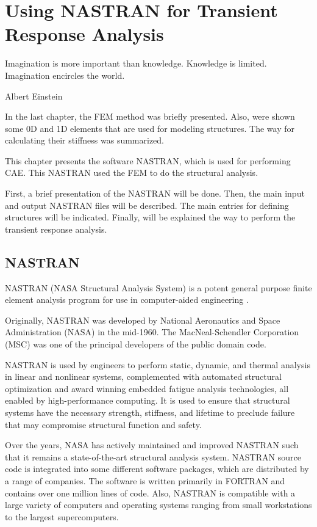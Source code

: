 \chapter{Using NASTRAN for Transient Response Analysis}
\label{chp:5}
\epigraph{Imagination is more important than knowledge. Knowledge is limited. Imagination encircles the world.}{Albert Einstein}

In the last chapter, the FEM method was briefly presented. Also, were shown some 0D and 1D elements that are used for modeling structures. The way for calculating their stiffness was summarized.

This chapter presents the software NASTRAN, which is used for performing CAE. This NASTRAN used the FEM to do the structural analysis.

First, a brief presentation of the NASTRAN will be done. Then, the main input and output NASTRAN files will be described. The main entries for defining structures will be indicated. Finally, will be explained the way to perform the transient response analysis.

\lstset{language=NASTRAN}
\lstset{basicstyle=\scriptsize\ttfamily,breaklines=true}

\section{NASTRAN}

NASTRAN (NASA Structural Analysis System) is a potent general purpose finite element analysis program for use in computer-aided engineering \cite{Nastran2001, Nastran2014}.

Originally, NASTRAN was developed by National Aeronautics and Space Administration (NASA) in the mid-1960. The MacNeal-Schendler Corporation (MSC) was one of the principal developers of the public domain code.

NASTRAN is used by engineers to perform static, dynamic, and thermal analysis in linear and nonlinear systems, complemented with automated structural optimization and award winning embedded fatigue analysis technologies, all enabled by high-performance computing. It is used to ensure that structural systems have the necessary strength, stiffness, and lifetime to preclude failure that may compromise structural function and safety.

Over the years, NASA has actively maintained and improved NASTRAN such that it remains a state-of-the-art structural analysis system. NASTRAN source code is integrated into some different software packages, which are distributed by a range of companies. The software is written primarily in FORTRAN and contains over one million lines of code. Also, NASTRAN is compatible with a large variety of computers and operating systems ranging from small workstations to the largest supercomputers.

